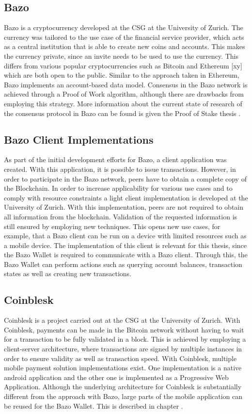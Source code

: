 \subsection{Bazo}
Bazo is a cryptocurrency developed at the CSG at the University of Zurich. The currency was tailored to the use case of the financial service provider, which acts as a central institution that is able to create new coins and accounts. This makes the currency private, since an invite needs to be used to use the currency. This differs from various popular cryptocurrencies such as Bitcoin and Ethereum [xy] which are both open to the public. Similar to the approach taken in Ethereum, Bazo implements an account-based data model. Consensus in the Bazo network is achieved through a Proof of Work algorithm, although there are drawbacks from employing this strategy. More information about the current state of research of the consensus protocol in Bazo can be found is given the Proof of Stake thesis \cite{proofofstake}.

\subsection{Bazo Client Implementations}
As part of the initial development efforts for Bazo, a client application was created. With this application, it is possible to issue transactions. However, in order to participate in the Bazo network, peers have to obtain a complete copy of the Blockchain. In order to increase applicability for various use cases and to comply with resource constraints a light client implementation is developed at the University of Zurich. With this implementation, peers are not required to obtain all information from the blockchain. Validation of the requested information is still ensured by employing new techniques. This opens new use cases, for example, that a Bazo client can be run on a device with limited resources such as a mobile device.
The implementation of this client is relevant for this thesis, since the Bazo Wallet is required to communicate with a Bazo client. Through this, the Bazo Wallet can perform actions such as querying account balances, transaction states as well as creating new transactions.
\subsection{Coinblesk}
Coinblesk is a project carried out at the CSG at the University of Zurich. With Coinblesk, payments can be made in the Bitcoin network without having to wait for a transaction to be fully validated in a block. This is achieved by employing a client-server architecture, where transactions are signed by multiple instances in order to ensure validity as well as transaction speed.
With Coinblesk, multiple mobile payment solution implementations exist. One implementation is a native android application and the other one is implemented as a Progressive Web Application. Although the underlying architecture for Coinblesk is substantially different from the approach with Bazo, large parts of the mobile application can be reused for the Bazo Wallet. This is described in chapter \cite{undefined}.
